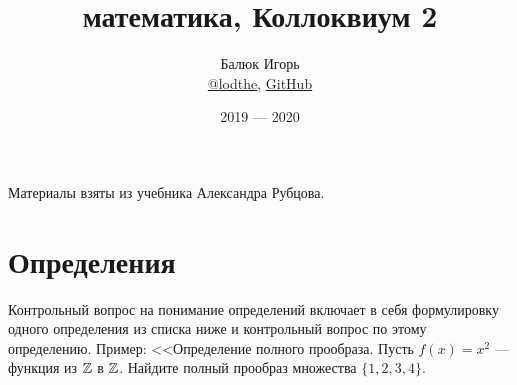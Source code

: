 \documentclass[a4paper]{article}
\title{\HugeДискретная математика, Коллоквиум 2}
\author{
	Балюк Игорь \\
	\href{https://teleg.run/lodthe}{@lodthe},
    \href{https://github.com/LoDThe/hse-tex}{GitHub} \\
}
\date{2019 --- 2020}
\theoremstyle{named}
\begin{document}
    \maketitle

    Материалы взяты из учебника Александра Рубцова.

    \tableofcontents

    \newpage

    \section{Определения}

    Контрольный вопрос на понимание определений включает в себя формулировку одного определения из списка ниже и контрольный вопрос по этому определению. Пример: <<Определение полного прообраза. Пусть $f(x) = x^2$ --- функция из $\mathbb{Z}$ в $\mathbb{Z}$. Найдите полный прообраз множества $\{1, 2, 3, 4\}$.
\end{document}
